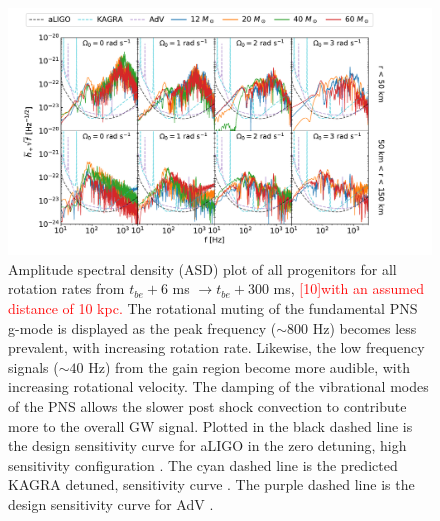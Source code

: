 \documentclass[twocolumn,times]{aastex62}  %
\begin{document}
\begin{figure}[t!]
  \centering     %
  \includegraphics[width=\textwidth]{tbe6tbe300_combined_M1_long_referee.pdf}
  \caption{Amplitude spectral density (ASD) plot of all progenitors for all rotation rates from $t_{be}+6$ ms $\rightarrow t_{be}+300$ ms, \textcolor{red}{[10]with an assumed distance of 10 kpc.}  The rotational muting of the fundamental PNS g-mode is displayed as the peak frequency ($\sim 800$ Hz) becomes less prevalent, with increasing rotation rate.  Likewise, the low frequency signals ($\sim40$ Hz) from the gain region become more audible, with increasing rotational velocity.  The damping of the vibrational modes of the PNS allows the slower post shock convection to contribute more to the overall GW signal.  Plotted in the black dashed line is the design sensitivity curve for aLIGO in the zero detuning, high sensitivity configuration \citep{barsotti:2018}.  The cyan dashed line is the predicted KAGRA detuned, sensitivity curve \citep{komari:2017}.  The purple dashed line is the design sensitivity curve for AdV \citep{abbott:2018}.}
  \label{fig:spetra_long}
\end{figure}
\end{document}
